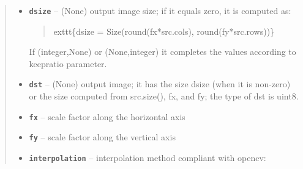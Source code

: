 \documentclass[letterpaper,10pt,english]{sphinxmanual}
\begin{document}
\begin{fulllineitems}
\begin{quote}
\begin{description}
\begin{itemize}
\item {} 
\textbf{\texttt{dsize}} -- 
(None) output image size; if it equals zero, it is computed as:
\begin{quote}

exttt\{dsize = Size(round(fx*src.cols), round(fy*src.rows))\}
\end{quote}

If (integer,None) or (None,integer) it completes the values according
to keepratio parameter.


\item {} 
\textbf{\texttt{dst}} -- (None) output image; it has the size dsize (when it is non-zero) or the
size computed from src.size(), fx, and fy; the type of dst is uint8.

\item {} 
\textbf{\texttt{fx}} -- scale factor along the horizontal axis

\item {} 
\textbf{\texttt{fy}} -- scale factor along the vertical axis

\item {} 
\textbf{\texttt{interpolation}} -- 
interpolation method compliant with opencv:


\end{itemize}
\end{description}
\end{quote}
\end{fulllineitems}
\end{document}
